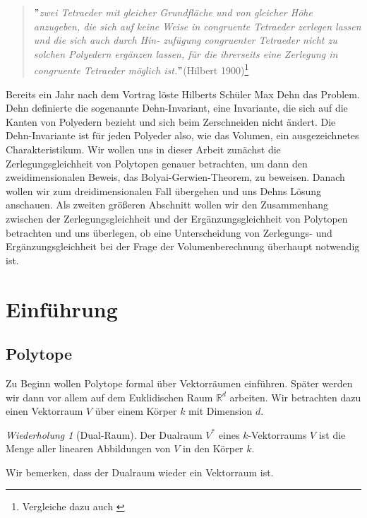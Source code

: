 \documentclass[11pt,titlepage]{article}
\newcommand{\setR}{\mathbb{R}}
\theoremstyle{definition}
\theoremstyle{remark}
\newtheorem*{repetition}{Wiederholung}
\begin{document}
	\begin{quote}
		\textsl{$"$zwei Tetraeder mit gleicher Grundfläche
			und von gleicher Höhe anzugeben, die sich auf keine Weise in
			congruente Tetraeder zerlegen lassen und die sich auch durch Hin-
			zufügung congruenter Tetraeder nicht zu solchen Polyedern ergänzen
			lassen, für die ihrerseits eine Zerlegung in congruente Tetraeder
			möglich ist.$"$}(Hilbert 1900)\footnote{Vergleiche dazu auch \cite{Hilbert1900}}
	\end{quote}
	Bereits ein Jahr nach dem Vortrag löste Hilberts Schüler Max Dehn 
	das Problem. Dehn definierte die sogenannte Dehn-Invariant, eine 
	Invariante, die sich auf die Kanten von Polyedern bezieht und sich 
	beim Zerschneiden nicht ändert. Die Dehn-Invariante ist für jeden Polyeder 
	also, wie das Volumen, ein ausgezeichnetes Charakteristikum. 
	Wir wollen uns in dieser Arbeit zunächst die Zerlegungsgleichheit 
	von Polytopen genauer betrachten, um dann den zweidimensionalen Beweis, 
	das Bolyai-Gerwien-Theorem, zu beweisen. Danach wollen wir zum 
	dreidimensionalen Fall übergehen und uns Dehns Lösung anschauen. 
	Als zweiten größeren Abschnitt wollen wir den Zusammenhang zwischen 
	der Zerlegungsgleichheit und der Ergänzungsgleichheit von Polytopen 
	betrachten und uns überlegen, ob eine Unterscheidung von Zerlegungs- 
	und Ergänzungsgleichheit bei der Frage der Volumenberechnung überhaupt 
	notwendig ist. 
	
	\newpage
	
	\section{Einführung}
	
	\subsection{Polytope}
	
	Zu Beginn wollen Polytope formal über Vektorräumen einführen. Später werden 
	wir dann vor allem auf dem Euklidischen Raum $\setR^d$ arbeiten. 
	Wir betrachten dazu einen Vektorraum $V$ über einem Körper $k$ mit Dimension $d$. 
	
	\begin{repetition}[Dual-Raum]
		Der Dualraum $V^*$ eines $k$-Vektorraums $V$ ist die Menge aller linearen Abbildungen von $V$ in den Körper $k$.
	\end{repetition}
	Wir bemerken, dass der Dualraum wieder ein Vektorraum ist.
	
\end{document}
